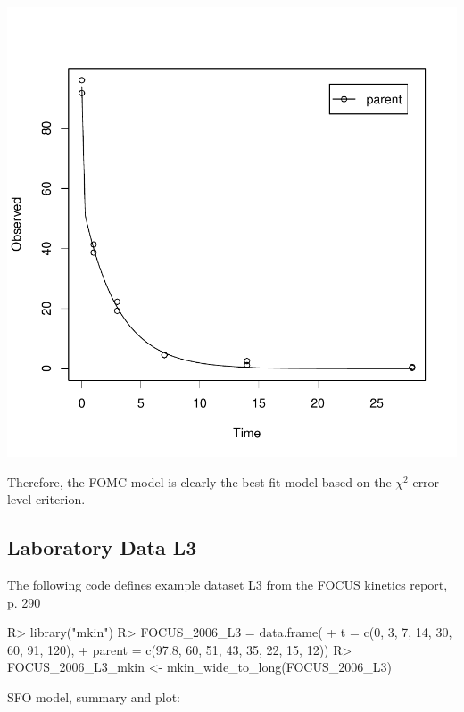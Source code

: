 \documentclass[12pt,a4paper]{article}
\begin{document}
\includegraphics{examples-L2_DFOP_2}

Therefore, the FOMC model is clearly the best-fit model based on the 
$\chi^2$ error level criterion.

\subsection{Laboratory Data L3}

The following code defines example dataset L3 from the FOCUS kinetics
report, p. 290

\begin{Schunk}
\begin{Sinput}
R> library("mkin")
R> FOCUS_2006_L3 = data.frame(
+   t = c(0, 3, 7, 14, 30, 60, 91, 120),
+   parent = c(97.8, 60, 51, 43, 35, 22, 15, 12))
R> FOCUS_2006_L3_mkin <- mkin_wide_to_long(FOCUS_2006_L3)
\end{Sinput}
\end{Schunk}

SFO model, summary and plot:
\end{document}
